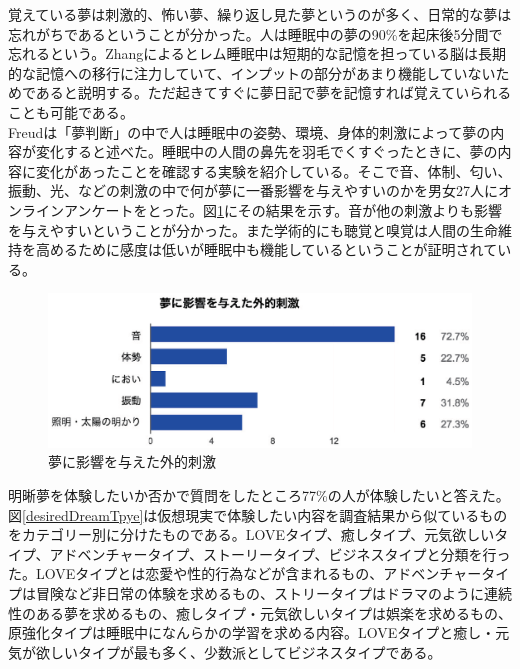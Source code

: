 覚えている夢は刺激的、怖い夢、繰り返し見た夢というのが多く、日常的な夢は忘れがちであるということが分かった。人は睡眠中の夢の90\%を起床後5分間で忘れるという。Zhangによるとレム睡眠中は短期的な記憶を担っている脳は長期的な記憶への移行に注力していて、インプットの部分があまり機能していないためであると説明する\cite{Zhang}。ただ起きてすぐに夢日記で夢を記憶すれば覚えていられることも可能である\cite{forgetDreams}。\\
Freudは「夢判断」の中で人は睡眠中の姿勢、環境、身体的刺激によって夢の内容が変化すると述べた\cite{freud}。睡眠中の人間の鼻先を羽毛でくすぐったときに、夢の内容に変化があったことを確認する実験を紹介している。そこで音、体制、匂い、振動、光、などの刺激の中で何が夢に一番影響を与えやすいのかを男女27人にオンラインアンケートをとった。図\ref{externalShigeki}にその結果を示す。音が他の刺激よりも影響を与えやすいということが分かった。また学術的にも聴覚と嗅覚は人間の生命維持を高めるために感度は低いが睡眠中も機能しているということが証明されている\cite{Zhang}。\\

\begin{figure}[htbp]
\begin{center}
\includegraphics[width=15cm]{eps/input.eps}
\caption{夢に影響を与えた外的刺激}
\label{externalShigeki}
\end{center}
\end{figure}

明晰夢を体験したいか否かで質問をしたところ77\%の人が体験したいと答えた。図\ref{desiredDreamTpye}は仮想現実で体験したい内容を調査結果から似ているものをカテゴリー別に分けたものである。LOVEタイプ、癒しタイプ、元気欲しいタイプ、アドベンチャータイプ、ストーリータイプ、ビジネスタイプと分類を行った。LOVEタイプとは恋愛や性的行為などが含まれるもの、アドベンチャータイプは冒険など非日常の体験を求めるもの、ストリータイプはドラマのように連続性のある夢を求めるもの、癒しタイプ・元気欲しいタイプは娯楽を求めるもの、原強化タイプは睡眠中になんらかの学習を求める内容。LOVEタイプと癒し・元気が欲しいタイプが最も多く、少数派としてビジネスタイプである。\\

